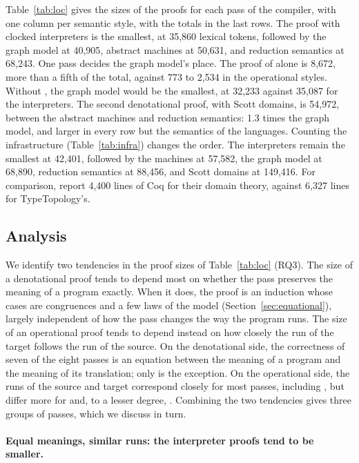 Table~\ref{tab:loc} gives the sizes of the proofs for each pass of the
compiler, with one column per semantic style, with the totals in the
last rows. The proof with clocked interpreters is the smallest, at
35,860 lexical tokens, followed by the graph model at 40,905, abstract
machines at 50,631, and reduction semantics at 68,243. One pass decides the graph
model's place. The proof of  alone is 8,672, more than a fifth of the
total, against 773 to 2,534 in the operational styles. Without
, the graph model would be the smallest, at 32,233
against 35,087 for the interpreters. The second denotational proof,
with Scott domains, is 54,972, between the abstract machines and
reduction semantics: 1.3 times the graph model, and larger in every
row but the semantics of the languages. Counting the infrastructure
(Table~\ref{tab:infra}) changes the order. The interpreters remain the
smallest at 42,401, followed by the machines at 57,582, the graph
model at 68,890, reduction semantics at 88,456, and Scott domains at
149,416. For comparison, \citet{Benton:2010aa} report 4,400 lines of
Coq for their domain theory, against 6,327 lines for
TypeTopology's.

\subsection{Analysis}

We identify two tendencies in the proof sizes of
Table~\ref{tab:loc} (RQ3). The size of a denotational proof tends to
depend most on whether the pass preserves the meaning of a program
exactly. When it does, the proof is an induction whose cases are
congruences and a few laws of the model
(Section~\ref{sec:equational}), largely independent of how the pass
changes the way the program runs. The size of an operational proof
tends to depend instead on how closely the run of the target follows
the run of the source. On the denotational side, the correctness of
seven of the eight passes is an equation between the meaning of a
program and the meaning of its translation; only 
is the exception. On the operational side, the runs of the source and
target correspond closely for most passes, including , but differ more for  and, to a lesser
degree, . Combining the two tendencies gives three groups of
passes, which we discuss in turn.

\paragraph{Equal meanings, similar runs: the interpreter proofs tend to be smaller.}

